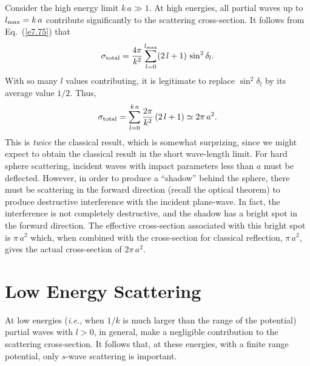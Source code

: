 Consider the high energy limit $k\,a\gg 1$. At high energies, all partial
waves up to $l_{\rm max} = k\,a$ contribute significantly to
the scattering cross-section. It follows from Eq.~(\ref{e7.75}) that
\begin{equation}\label{e7.99}
\sigma_{\rm total} = \frac{4\pi}{k^2} \sum_{l=0}^{l_{\rm max}}
(2\,l+1)\,\sin^2\delta_l.
\end{equation}
With so many $l$ values contributing, it is legitimate to replace
$\sin^2\delta_l$ by its average value $1/2$. Thus,
\begin{equation}
\sigma_{\rm total} = \sum_{l=0}^{k\,a} \frac{2\pi}{k^2} \,(2\,l+1) \simeq 
2\pi \,a^2.
\end{equation}
This is {\em twice}\/ the classical result, which is  somewhat surprizing,
since we might expect to obtain the classical result in the short
wave-length limit. For hard sphere scattering, incident waves with
impact parameters less than $a$ must be deflected. However, in order to
produce a ``shadow'' behind the sphere, there must be scattering
in the forward direction (recall the optical theorem) to produce
destructive interference with the incident plane-wave. In fact, the
interference is not completely destructive, and the shadow has a bright
spot in the forward direction. The effective cross-section associated with
this bright spot is $\pi \,a^2$ which, when combined with the
cross-section for classical reflection, $\pi \,a^2$, gives the actual
cross-section of $2\pi \,a^2$.
 
\section{Low Energy Scattering}
At low energies ({\em i.e.}, when $1/k$ is much larger than the range
of the potential) partial waves with $l>0$, in general, make a
negligible contribution to the scattering cross-section. It follows
that, at these energies, with a finite range potential, only $s$-wave
scattering is important.

